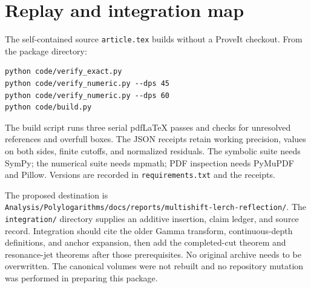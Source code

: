 \documentclass[11pt,letterpaper]{article}
\theoremstyle{definition}\newtheorem{definition}[theorem]{Definition}
\theoremstyle{remark}\newtheorem{remark}[theorem]{Remark}
\newcommand{\src}[1]{\nolinkurl{#1}}
\begin{document}
\section{Replay and integration map}
\label{mr:app:replay}
The self-contained source \src{article.tex} builds without a ProveIt
checkout. From the package directory:
\begin{verbatim}
python code/verify_exact.py
python code/verify_numeric.py --dps 45
python code/verify_numeric.py --dps 60
python code/build.py
\end{verbatim}
The build script runs three serial pdfLaTeX passes and checks for
unresolved references and overfull boxes. The JSON receipts retain
working precision, values on both sides, finite cutoffs, and normalized
residuals. The symbolic suite needs SymPy; the numerical suite needs
mpmath; PDF inspection needs PyMuPDF and Pillow. Versions are recorded
in \src{requirements.txt} and the receipts.

The proposed destination is
\src{Analysis/Polylogarithms/docs/reports/multishift-lerch-reflection/}.
The \src{integration/} directory supplies an additive insertion,
claim ledger, and source record. Integration should cite the older
Gamma transform, continuous-depth definitions, and anchor expansion,
then add the completed-cut theorem and resonance-jet theorems after
those prerequisites. No original archive needs to be overwritten.
The canonical volumes were not rebuilt and no repository mutation was
performed in preparing this package.
\end{document}
